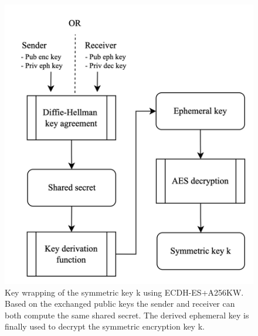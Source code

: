 \documentclass[../main.tex]{subfiles}
\begin{document}
\begin{figure}[ht]
    \includegraphics[scale=0.2]{../img/07/key_wrapping.jpg}
    \centering
    \caption[Key wrapping]{
        Key wrapping of the symmetric key k using ECDH-ES+A256KW. 
        Based on the exchanged public keys the sender and receiver can both compute the same shared secret.
        The derived ephemeral key is finally used to decrypt the symmetric encryption key k.}
    \label{fig:key_wrapping}
\end{figure}
\end{document}
